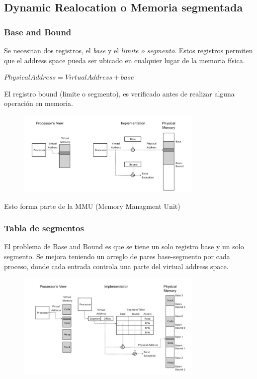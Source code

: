 \documentclass[titlepage,a4paper]{article}
\begin{document}
\subsection*{Dynamic Realocation o Memoria segmentada}
\subsubsection*{Base and Bound}
Se necesitan dos registros, el \textit{base} y el \textit{limite o segmento}. Estos registros permiten que el address space pueda ser ubicado en cualquier lugar de la memoria física.

\begin{math}
PhysicalAddress = VirtualAddress + base
\end{math}

El registro bound (limite o segmento), es verificado antes de realizar alguna operación en memoria.

\begin{figure}[!htb]
    \centering
    \includegraphics[width=0.8\textwidth]{ImagenesApunte/base_bound.jpg}
\end{figure}

Esto forma parte de la MMU (Memory Managment Unit)

\subsubsection*{Tabla de segmentos}
El problema de Base and Bound es que se tiene un solo registro base y un solo segmento. Se mejora teniendo un arreglo de pares base-segmento por cada proceso,  donde cada entrada controla una parte del virtual address space.

\begin{figure}[!htb]
    \centering
    \includegraphics[width=0.8\textwidth]{ImagenesApunte/segment_table.jpg}
\end{figure}
\end{document}
